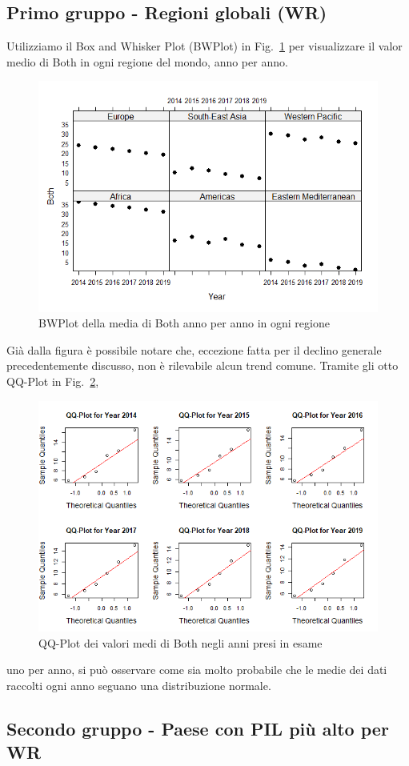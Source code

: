 \documentclass[conference]{IEEEtran}
\begin{document}
\subsection{Primo gruppo - Regioni globali (WR)}
Utilizziamo il Box and Whisker Plot (BWPlot) in Fig.~\ref{5firstgroup} per visualizzare il
valor medio di Both in ogni regione del mondo, anno per anno.
\begin{figure}[htbp]
    \centerline{\includegraphics[width=.5\textwidth]{img/5 - Firstgroup.png}}
    \caption{BWPlot della media di Both anno per anno in ogni regione}
    \label{5firstgroup}
\end{figure}
Già dalla figura è possibile notare che, eccezione fatta per il declino generale
precedentemente discusso, non è rilevabile
alcun trend comune.
Tramite gli otto QQ-Plot in Fig.~\ref{6firstqq},
\begin{figure}[htbp]
    \centerline{\includegraphics[width=.5\textwidth]{img/6 - Firstqq.png}}
    \caption{QQ-Plot dei valori medi di Both negli anni presi in esame}
    \label{6firstqq}
\end{figure}
uno per anno, si può osservare come sia
molto probabile che le medie dei dati raccolti ogni anno seguano una distribuzione normale.


\subsection{Secondo gruppo - Paese con PIL più alto per WR}
\end{document}
